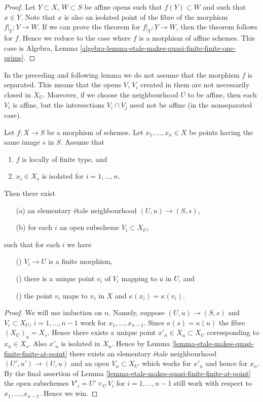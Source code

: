 \begin{proof}
Let $Y \subset X$, $W \subset S$ be affine opens such that
$f(Y) \subset W$ and such that $x \in Y$. Note that $x$ is
also an isolated point of the fibre of the morphism $f|_Y : Y \to W$.
If we can prove the theorem for $f|_Y : Y \to W$, then the
theorem follows for $f$. Hence we reduce to the case where
$f$ is a morphism of affine schemes. This case is
Algebra, Lemma \ref{algebra-lemma-etale-makes-quasi-finite-finite-one-prime}.
\end{proof}

\noindent
In the preceding and following lemma we do not assume that the morphism
$f$ is separated. This means that the opens $V$, $V_i$ created
in them are not necessarily closed in $X_U$. Moreover, if we choose
the neighbourhood $U$ to be affine, then each $V_i$ is affine, but
the intersections $V_i \cap V_j$ need not be affine (in the nonseparated
case).

\begin{lemma}
\label{lemma-etale-makes-quasi-finite-finite-multiple-points}
Let $f : X \to S$ be a morphism of schemes.
Let $x_1, \ldots, x_n \in X$ be points having the same image $s$ in $S$.
Assume that
\begin{enumerate}
\item $f$ is locally of finite type, and
\item $x_i \in X_s$ is isolated for $i = 1, \ldots, n$.
\end{enumerate}
Then there exist
\begin{enumerate}
\item[(a)] an elementary \'etale neighbourhood $(U, u) \to (S, s)$,
\item[(b)] for each $i$ an open subscheme $V_i \subset X_U$,
\end{enumerate}
such that for each $i$ we have
\begin{enumerate}
\item[(\romannumeral1)] $V_i \to U$ is a finite morphism,
\item[(\romannumeral2)] there is a unique point $v_i$ of $V_i$
mapping to $u$ in $U$, and
\item[(\romannumeral3)] the point $v_i$ maps to $x_i$ in $X$ and
$\kappa(x_i) = \kappa(v_i)$.
\end{enumerate}
\end{lemma}

\begin{proof}
We will use induction on $n$.
Namely, suppose $(U, u) \to (S, s)$ and $V_i \subset X_U$,
$i = 1, \ldots, n - 1$ work for $x_1, \ldots, x_{n - 1}$. Since
$\kappa(s) = \kappa(u)$ the fibre $(X_U)_u = X_s$. Hence there
exists a unique point $x'_n \in X_u \subset X_U$ corresponding to
$x_n \in X_s$. Also $x'_n$ is isolated in $X_u$. Hence by
Lemma \ref{lemma-etale-makes-quasi-finite-finite-at-point} there
exists an elementary \'etale neighbourhood $(U', u') \to (U, u)$
and an open $V_n \subset X_{U'}$ which works for $x'_n$ and hence
for $x_n$.
By the final assertion of
Lemma \ref{lemma-etale-makes-quasi-finite-finite-at-point}
the open subschemes $V'_i = U'\times_U V_i$ for $i = 1, \ldots, n - 1$ still
work with respect to $x_1, \ldots, x_{n - 1}$. Hence we win.
\end{proof}


